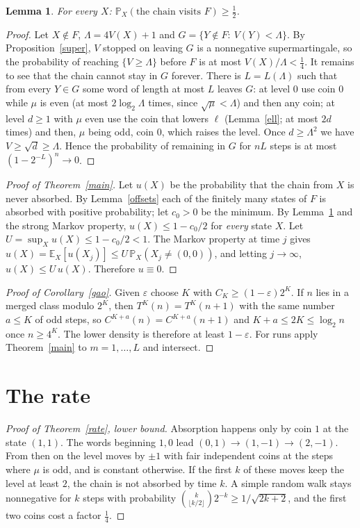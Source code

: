 \documentclass[11pt]{article}
\newtheorem{lemma}[theorem]{Lemma}
\theoremstyle{remark}
\newcommand{\PP}{\mathbb{P}}
\begin{document}
\begin{lemma}\label{hitF}
For every $X$: $\PP_X(\text{the chain visits }F)\ge\tfrac12$.
\end{lemma}
\begin{proof}
Let $X\notin F$, $\Lambda=4V(X)+1$ and $G=\{Y\notin F:\ V(Y)<\Lambda\}$. By
Proposition~\ref{super}, $V$ stopped on leaving $G$ is a nonnegative supermartingale, so the
probability of reaching $\{V\ge\Lambda\}$ before $F$ is at most $V(X)/\Lambda<\tfrac14$. It remains
to see that the chain cannot stay in $G$ forever. There is $L=L(\Lambda)$ such that from every
$Y\in G$ some word of length at most $L$ leaves $G$: at level $0$ use coin $0$ while $\mu$ is even
(at most $2\log_2\Lambda$ times, since $\sqrt\mu<\Lambda$) and then any coin; at level $d\ge1$
with $\mu$ even use the coin that lowers $\ell$ (Lemma~\ref{ell}; at most $2d$ times) and then,
$\mu$ being odd, coin $0$, which raises the level. Once $d\ge\Lambda^2$ we have
$V\ge\sqrt d\ge\Lambda$. Hence the probability of remaining in $G$ for $nL$ steps is at most
$(1-2^{-L})^n\to0$.
\end{proof}

\begin{proof}[Proof of Theorem~\ref{main}]
Let $u(X)$ be the probability that the chain from $X$ is never absorbed. By Lemma~\ref{offsets}
each of the finitely many states of $F$ is absorbed with positive probability; let $c_0>0$ be the
minimum. By Lemma~\ref{hitF} and the strong Markov property, $u(X)\le1-c_0/2$ for \emph{every}
state $X$. Let $U=\sup_Xu(X)\le1-c_0/2<1$. The Markov property at time $j$ gives
$u(X)=\mathbb E_X[u(X_j)]\le U\,\PP_X(X_j\ne(0,0))$, and letting $j\to\infty$,
$u(X)\le U\,u(X)$. Therefore $u\equiv0$.
\end{proof}

\begin{proof}[Proof of Corollary~\ref{gao}]
Given $\varepsilon$ choose $K$ with $C_K\ge(1-\varepsilon)2^K$. If $n$ lies in a merged class
modulo $2^K$, then $T^K(n)=T^K(n+1)$ with the same number $a\le K$ of odd steps, so
$C^{K+a}(n)=C^{K+a}(n+1)$ and $K+a\le2K\le\log_2n$ once $n\ge4^K$. The lower density is therefore
at least $1-\varepsilon$. For runs apply Theorem~\ref{main} to $m=1,\dots,L$ and intersect.
\end{proof}

\section{The rate}
\begin{proof}[Proof of Theorem~\ref{rate}, lower bound]
Absorption happens only by coin $1$ at the state $(1,1)$. The words beginning $1,0$ lead
$(0,1)\to(1,-1)\to(2,-1)$. From then on the level moves by $\pm1$ with fair independent coins at
the steps where $\mu$ is odd, and is constant otherwise. If the first $k$ of these moves keep the
level at least $2$, the chain is not absorbed by time $k$. A simple random walk stays nonnegative
for $k$ steps with probability $\binom{k}{\lfloor k/2\rfloor}2^{-k}\ge1/\sqrt{2k+2}$, and the first two coins cost a factor $\tfrac14$.
\end{proof}
\end{document}
